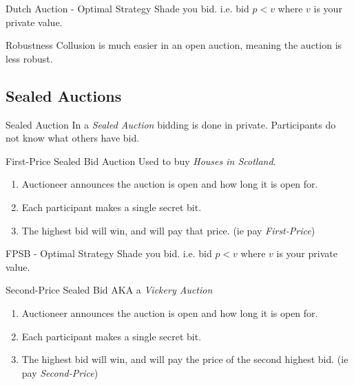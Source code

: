 \documentclass[11pt,a4paper]{article}
\begin{document}
  \begin{proposition}{Dutch Auction - Optimal Strategy}
    Shade you bid. i.e. bid $p<v$ where $v$ is your private value.
  \end{proposition}

  \begin{remark}{Robustness}
    Collusion is much easier in an open auction, meaning the auction is less robust.
  \end{remark}

\subsection{Sealed Auctions}

  \begin{definition}{Sealed Auction}
    In a \textit{Sealed Auction} bidding is done in private. Participants do not know what others have bid.
  \end{definition}

  \begin{definition}{First-Price Sealed Bid Auction}
    Used to buy \textit{Houses in Scotland}.
    \begin{enumerate}
      \item Auctioneer announces the auction is open and how long it is open for.
      \item Each participant makes a single secret bit.
      \item The highest bid will win, and will pay that price. (ie pay \textit{First-Price})
    \end{enumerate}
  \end{definition}

  \begin{proposition}{FPSB - Optimal Strategy}
    Shade you bid. i.e. bid $p<v$ where $v$ is your private value.
  \end{proposition}

  \begin{definition}{Second-Price Sealed Bid}
    AKA a \textit{Vickery Auction}
    \begin{enumerate}
      \item Auctioneer announces the auction is open and how long it is open for.
      \item Each participant makes a single secret bit.
      \item The highest bid will win, and will pay the price of the second highest bid. (ie pay \textit{Second-Price})
    \end{enumerate}
  \end{definition}
\end{document}
